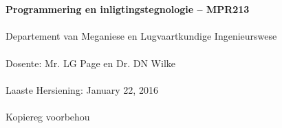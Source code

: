 \begin{titlepage}
    \thispagestyle{empty}
    \\~\\[18cm]
    \large
    \textbf{Programmering en inligtingstegnologie -- MPR213} \\~\\
    Departement van Meganiese en Lugvaartkundige Ingenieurswese \\~\\[0.5cm]
    \normalsize
    Dosente: Mr. LG Page en  Dr. DN Wilke \\~\\
    Laaste Hersiening: January 22, 2016 \\~\\[0.5em]
    \textcopyright \quad Kopiereg voorbehou \\~\\
\end{titlepage}
\restoregeometry
